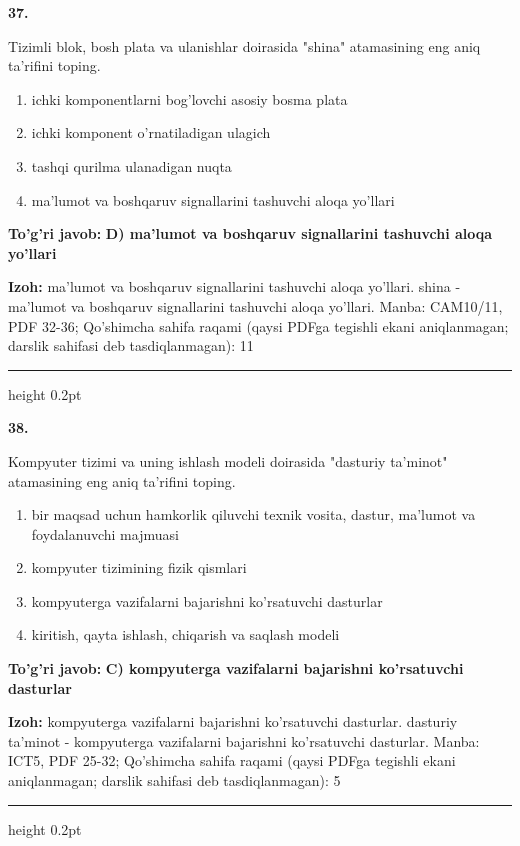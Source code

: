 \documentclass[10pt,a4paper]{article}
\begin{document}
{\bfseries\sffamily\color{ink} 37.}
\par
Tizimli blok, bosh plata va ulanishlar doirasida "shina" atamasining eng aniq ta'rifini toping.
\begin{enumerate}[label=\Alph*),leftmargin=9mm]
\item ichki komponentlarni bog'lovchi asosiy bosma plata
\item ichki komponent o'rnatiladigan ulagich
\item tashqi qurilma ulanadigan nuqta
\item ma'lumot va boshqaruv signallarini tashuvchi aloqa yo'llari
\end{enumerate}
\begin{tcolorbox}[enhanced,breakable,colback=teal!4,colframe=teal!60!black,boxrule=0.45pt,arc=1.2mm,left=2.7mm,right=2.7mm,top=1.8mm,bottom=1.8mm,before skip=2mm,after skip=2mm]
{\bfseries\sffamily\color{teal}To'g'ri javob:} \textbf{D) ma'lumot va boshqaruv signallarini tashuvchi aloqa yo'llari}
\par\smallskip
{\bfseries Izoh:} ma'lumot va boshqaruv signallarini tashuvchi aloqa yo'llari. shina - ma'lumot va boshqaruv signallarini tashuvchi aloqa yo'llari. Manba: CAM10/11, PDF 32-36; Qo'shimcha sahifa raqami (qaysi PDFga tegishli ekani aniqlanmagan; darslik sahifasi deb tasdiqlanmagan): 11
\end{tcolorbox}
\vspace{2mm}\hrule height 0.2pt\vspace{3mm}

{\bfseries\sffamily\color{ink} 38.}
\par
Kompyuter tizimi va uning ishlash modeli doirasida "dasturiy ta'minot" atamasining eng aniq ta'rifini toping.
\begin{enumerate}[label=\Alph*),leftmargin=9mm]
\item bir maqsad uchun hamkorlik qiluvchi texnik vosita, dastur, ma'lumot va foydalanuvchi majmuasi
\item kompyuter tizimining fizik qismlari
\item kompyuterga vazifalarni bajarishni ko'rsatuvchi dasturlar
\item kiritish, qayta ishlash, chiqarish va saqlash modeli
\end{enumerate}
\begin{tcolorbox}[enhanced,breakable,colback=teal!4,colframe=teal!60!black,boxrule=0.45pt,arc=1.2mm,left=2.7mm,right=2.7mm,top=1.8mm,bottom=1.8mm,before skip=2mm,after skip=2mm]
{\bfseries\sffamily\color{teal}To'g'ri javob:} \textbf{C) kompyuterga vazifalarni bajarishni ko'rsatuvchi dasturlar}
\par\smallskip
{\bfseries Izoh:} kompyuterga vazifalarni bajarishni ko'rsatuvchi dasturlar. dasturiy ta'minot - kompyuterga vazifalarni bajarishni ko'rsatuvchi dasturlar. Manba: ICT5, PDF 25-32; Qo'shimcha sahifa raqami (qaysi PDFga tegishli ekani aniqlanmagan; darslik sahifasi deb tasdiqlanmagan): 5
\end{tcolorbox}
\vspace{2mm}\hrule height 0.2pt\vspace{3mm}
\end{document}
